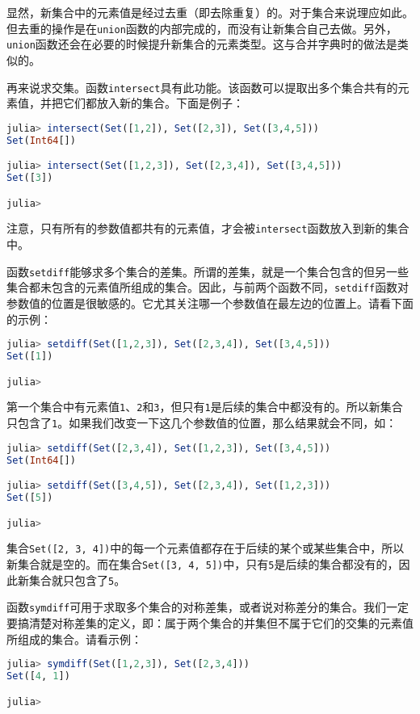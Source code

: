 显然，新集合中的元素值是经过去重（即去除重复）的。对于集合来说理应如此。但去重的操作是在\verb`union`函数的内部完成的，而没有让新集合自己去做。另外，\verb`union`函数还会在必要的时候提升新集合的元素类型。这与合并字典时的做法是类似的。

再来说求交集。函数\verb`intersect`具有此功能。该函数可以提取出多个集合共有的元素值，并把它们都放入新的集合。下面是例子：

\begin{lstlisting}[language=julia]
julia> intersect(Set([1,2]), Set([2,3]), Set([3,4,5]))
Set(Int64[])

julia> intersect(Set([1,2,3]), Set([2,3,4]), Set([3,4,5]))
Set([3])

julia> 
\end{lstlisting}

注意，只有所有的参数值都共有的元素值，才会被\verb`intersect`函数放入到新的集合中。

函数\verb`setdiff`能够求多个集合的差集。所谓的差集，就是一个集合包含的但另一些集合都未包含的元素值所组成的集合。因此，与前两个函数不同，\verb`setdiff`函数对参数值的位置是很敏感的。它尤其关注哪一个参数值在最左边的位置上。请看下面的示例：

\begin{lstlisting}[language=julia]
julia> setdiff(Set([1,2,3]), Set([2,3,4]), Set([3,4,5]))
Set([1])

julia> 
\end{lstlisting}

第一个集合中有元素值\verb`1`、\verb`2`和\verb`3`，但只有\verb`1`是后续的集合中都没有的。所以新集合只包含了\verb`1`。如果我们改变一下这几个参数值的位置，那么结果就会不同，如：

\begin{lstlisting}[language=julia]
julia> setdiff(Set([2,3,4]), Set([1,2,3]), Set([3,4,5]))
Set(Int64[])

julia> setdiff(Set([3,4,5]), Set([2,3,4]), Set([1,2,3]))
Set([5])

julia> 
\end{lstlisting}

集合\verb`Set([2, 3, 4])`中的每一个元素值都存在于后续的某个或某些集合中，所以新集合就是空的。而在集合\verb`Set([3, 4, 5])`中，只有\verb`5`是后续的集合都没有的，因此新集合就只包含了\verb`5`。

函数\verb`symdiff`可用于求取多个集合的对称差集，或者说对称差分的集合。我们一定要搞清楚对称差集的定义，即：属于两个集合的并集但不属于它们的交集的元素值所组成的集合。请看示例：

\begin{lstlisting}[language=julia]
julia> symdiff(Set([1,2,3]), Set([2,3,4]))
Set([4, 1])

julia> 
\end{lstlisting}

